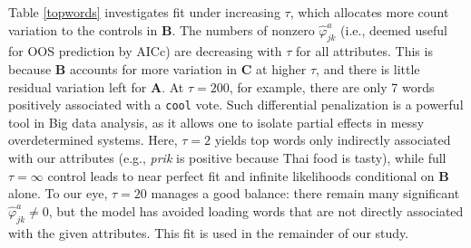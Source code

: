 \documentclass[12pt]{article}
\newcommand{\bm}[1]{\mathbf{#1}}
\newcommand{\cd}[1]{{\tt#1}}
\begin{document}
Table \ref{topwords} investigates fit under increasing $\tau$, which allocates
more  count variation to the controls in $\bm{B}$.  The numbers of nonzero
$\hat\varphi^a_{jk}$  (i.e., deemed useful for OOS prediction by AICc) are
decreasing with $\tau$ for all attributes.  This is because $\bm{B}$ accounts
for more variation in $\bm{C}$ at higher $\tau$, and  there is little residual
variation left for $\bm{A}$.  At $\tau=200$, for example, there are only 7
words positively associated with a
\cd{cool} vote. Such differential penalization is a powerful tool in Big data
analysis,  as it allows one to isolate partial effects in messy overdetermined
systems.  Here, $\tau=2$ yields top words only indirectly
associated with our attributes (e.g., {\it prik} is positive because Thai food
is tasty), while  full $\tau=\infty$ control leads to near perfect fit and
infinite likelihoods conditional on $\bm{B}$ alone. To our eye, $\tau=20$
manages a good balance: there remain many significant
$\hat\varphi^a_{jk}\neq 0$, but the model has avoided loading  words that
are not directly associated with the given attributes.  This fit is used in
the remainder of our study.
\end{document}
